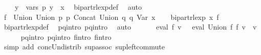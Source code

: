 \begin{isabellebody}
\ \ \ \ {\isacharparenleft}{\kern0pt}{\isasymforall}y\ {\isasymin}\ vars\ p{}{\isachardot}{\kern0pt}\ y\ {\isasymnoteq}\ x{\isacharparenright}{\kern0pt}{\isachardoublequoteclose}\ \isamarkupfalse%
\ bipart{\isacharunderscore}{\kern0pt}rlexp{\isacharunderscore}{\kern0pt}def\ \isamarkupfalse%
\ auto\isanewline
\ \ \isamarkupfalse%
\ {\isacharquery}{\kern0pt}f{\isacharprime}{\kern0pt}\ {\isacharequal}{\kern0pt}\ {\isachardoublequoteopen}Union\ {\isacharparenleft}{\kern0pt}Union\ p{}\ p{}{\isacharparenright}{\kern0pt}\ {\isacharparenleft}{\kern0pt}Concat\ {\isacharparenleft}{\kern0pt}Union\ q{}\ q{}{\isacharparenright}{\kern0pt}\ {\isacharparenleft}{\kern0pt}Var\ x{\isacharparenright}{\kern0pt}{\isacharparenright}{\kern0pt}{\isachardoublequoteclose}\isanewline
\ \ \isamarkupfalse%
\ {\isachardoublequoteopen}bipart{\isacharunderscore}{\kern0pt}rlexp\ x\ {\isacharquery}{\kern0pt}f{\isacharprime}{\kern0pt}{\isachardoublequoteclose}\ \isamarkupfalse%
\ bipart{\isacharunderscore}{\kern0pt}rlexp{\isacharunderscore}{\kern0pt}def\ \isamarkupfalse%
\ p{}{\isacharunderscore}{\kern0pt}q{}{\isacharunderscore}{\kern0pt}intro\ p{}{\isacharunderscore}{\kern0pt}q{}{\isacharunderscore}{\kern0pt}intro\ \isamarkupfalse%
\ auto\isanewline
\ \ \isamarkupfalse%
\ \isamarkupfalse%
\ {\isachardoublequoteopen}{\isasymPsi}\ {\isacharparenleft}{\kern0pt}eval\ {\isacharquery}{\kern0pt}f{\isacharprime}{\kern0pt}\ v{\isacharparenright}{\kern0pt}\ {\isacharequal}{\kern0pt}\ {\isasymPsi}\ {\isacharparenleft}{\kern0pt}eval\ {\isacharparenleft}{\kern0pt}Union\ f{}\ f{}{\isacharparenright}{\kern0pt}\ v{\isacharparenright}{\kern0pt}{\isachardoublequoteclose}\ \ v\isanewline
\ \ \ \ \isamarkupfalse%
\ p{}{\isacharunderscore}{\kern0pt}q{}{\isacharunderscore}{\kern0pt}intro\ p{}{\isacharunderscore}{\kern0pt}q{}{\isacharunderscore}{\kern0pt}intro\ f{}{\isacharprime}{\kern0pt}{\isacharunderscore}{\kern0pt}intro\ f{}{\isacharprime}{\kern0pt}{\isacharunderscore}{\kern0pt}intro\isanewline
\ \ \ \ \isamarkupfalse%
\ {\isacharparenleft}{\kern0pt}simp\ add{\isacharcolon}{\kern0pt}\ conc{\isacharunderscore}{\kern0pt}Un{\isacharunderscore}{\kern0pt}distrib{\isacharparenleft}{\kern0pt}{}{\isacharparenright}{\kern0pt}\ sup{\isacharunderscore}{\kern0pt}assoc\ sup{\isacharunderscore}{\kern0pt}left{\isacharunderscore}{\kern0pt}commute{\isacharparenright}{\kern0pt}\isanewline

\end{isabellebody}
